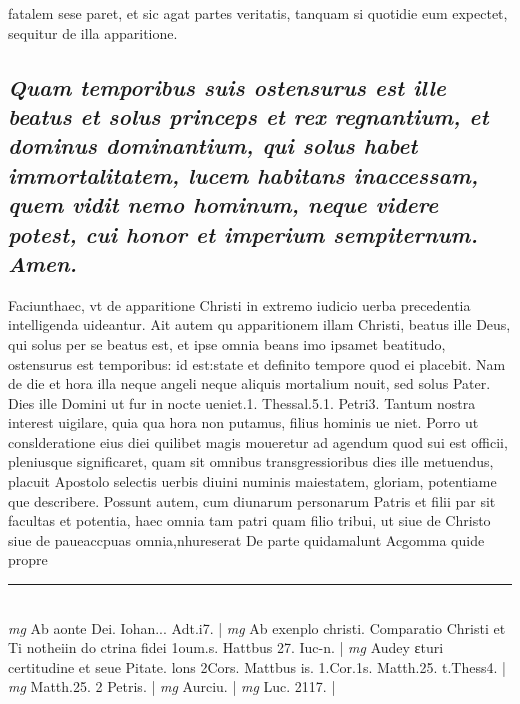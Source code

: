 \documentclass{article}
\begin{document}
\begin{pages}
fatalem sese paret, et sic agat partes veritatis, tanquam si quotidie eum expectet, sequitur de illa apparitione.  \pend
{}
{}
\subsection*{\textit{Quam temporibus suis ostensurus est ille beatus et solus princeps et rex regnantium, et dominus dominantium, qui solus habet immortalitatem, lucem habitans inaccessam, quem vidit nemo hominum, neque videre potest, cui honor et imperium sempiternum. Amen. }}\pstart Faciunthaec, vt de apparitione Christi in extremo iudicio uerba precedentia intelligenda uideantur. Ait autem qu apparitionem illam Christi, beatus ille Deus, qui solus per se beatus est, et ipse omnia beans imo ipsamet beatitudo, ostensurus est temporibus: id est:state et definito tempore quod ei placebit. Nam de die et hora illa neque angeli neque aliquis mortalium nouit, sed solus Pater. Dies ille Domini ut fur in nocte ueniet.1. Thessal.5.1. Petri3. Tantum nostra interest uigilare, quia qua hora non putamus, filius hominis ue niet. Porro ut conslderatione eius diei quilibet magis moueretur ad agendum quod sui est officii, pleniusque significaret, quam sit omnibus transgressioribus dies ille metuendus, placuit Apostolo selectis uerbis diuini numinis maiestatem, gloriam, potentiame que describere. Possunt autem, cum diunarum personarum Patris et filii par sit facultas et potentia, haec omnia tam patri quam filio tribui, ut siue de Christo siue de paueaccpuas omnia,nhureserat De parte quidamalunt Acgomma quide propre  \pend
\vspace{0.5cm}\noindent
\vspace{0.2cm}\rule{1cm}{0.2pt}\\ 
\hspace{0.2cm}\textit{mg}
\footnotesize Ab aonte Dei. Iohan... Adt.i7. 
\normalsize| 
\hspace{0.2cm}\textit{mg}
\footnotesize Ab exenplo christi. Comparatio Christi et Ti notheiin do ctrina fidei 1oum.s. Hattbus 27. Iuc-n. 
\normalsize| 
\hspace{0.2cm}\textit{mg}
\footnotesize Audey εturi certitudine et seue Pitate. lons 2Cors. Mattbus is. 1.Cor.1s. Matth.25. t.Thess4. 
\normalsize| 
\hspace{0.2cm}\textit{mg}
\footnotesize Matth.25. 2 Petris. 
\normalsize| 
\hspace{0.2cm}\textit{mg}
\footnotesize Aurciu. 
\normalsize| 
\hspace{0.2cm}\textit{mg}
\footnotesize Luc. 2117. 
\normalsize| 

\end{pages}
\end{document}
